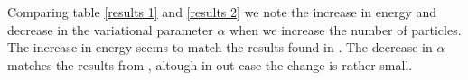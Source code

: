 \documentclass[a4paper, 10pt, english]{revtex4-2} %
\begin{document}
    Comparing table \ref{results 1} and \ref{results 2} we note the increase in energy and decrease in the variational parameter $\alpha$ when we increase the number of particles.
    The increase in energy seems to match the results found in \cite{dubois2001bose}.
    The decrease in $\alpha$ matches the results from \cite{nilsen2005vortices}, altough in out case the change is rather small.






\end{document}
